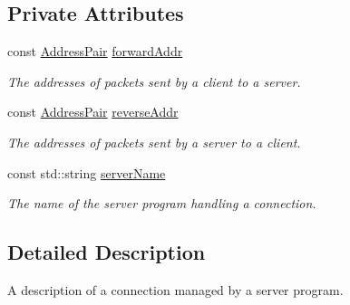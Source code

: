 \subsection*{\-Private \-Attributes}
\begin{DoxyCompactItemize}
\item 
const \hyperlink{structNERD_1_1ConnectionServer_1_1AddressPair}{\-Address\-Pair} \hyperlink{classNERD_1_1ConnectionServer_1_1Connection_a1e0a150fe344d8ac0173ff34985f275f}{forward\-Addr}
\begin{DoxyCompactList}\small\item\em \-The addresses of packets sent by a client to a server. \end{DoxyCompactList}\item 
const \hyperlink{structNERD_1_1ConnectionServer_1_1AddressPair}{\-Address\-Pair} \hyperlink{classNERD_1_1ConnectionServer_1_1Connection_add4fb710d6212e0f8501bb2bb29b523d}{reverse\-Addr}
\begin{DoxyCompactList}\small\item\em \-The addresses of packets sent by a server to a client. \end{DoxyCompactList}\item 
const std\-::string \hyperlink{classNERD_1_1ConnectionServer_1_1Connection_ac2d5abf39fc698fd831419e20bbc0eba}{server\-Name}
\begin{DoxyCompactList}\small\item\em \-The name of the server program handling a connection. \end{DoxyCompactList}\end{DoxyCompactItemize}


\subsection{\-Detailed \-Description}
\-A description of a connection managed by a server program. 

